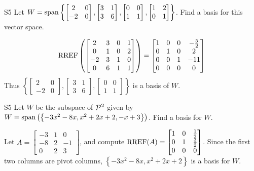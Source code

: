 \begin{problem}{S5}
Let \(
  W={\rm span}\left\{
    \begin{bmatrix} 2 & 0 \\ -2 & 0 \end{bmatrix},
    \begin{bmatrix} 3 & 1 \\ 3 & 6 \end{bmatrix},
    \begin{bmatrix} 0 & 0 \\ 1 & 1 \end{bmatrix},
    \begin{bmatrix} 1 & 2 \\ 0 & 1 \end{bmatrix}
  \right\}
\). Find a basis for this vector space.
\end{problem}
\begin{solution}
\[
  \RREF\left(\begin{bmatrix}
    2 & 3 & 0 & 1 \\
    0 & 1 & 0 & 2 \\
    -2 & 3 & 1 & 0 \\
    0 & 6 & 1 & 1
  \end{bmatrix} \right) =
  \begin{bmatrix}
    1 & 0 & 0 & -\frac{5}{2} \\
    0 & 1 & 0 & 2 \\
    0 & 0 & 1 & -11\\
    0 & 0 & 0 & 0
  \end{bmatrix}
\]
Thus \(\left\{
  \begin{bmatrix} 2 & 0 \\ -2 & 0 \end{bmatrix},
  \begin{bmatrix} 3 & 1 \\ 3 & 6 \end{bmatrix},
  \begin{bmatrix} 0 & 0 \\ 1 & 1 \end{bmatrix}
\right\}\) is a basis of $W$.
\end{solution}

\begin{problem}{S5}
Let $W$ be the subspace of $\P^2$ given by $W = {\rm span} \left( \left\{  -3x^2-8x, x^2+2x+2, -x+3\right\} \right)$.   Find a basis for $W$.
\end{problem}
\begin{solution}
Let $A= \begin{bmatrix}-3 & 1 & 0 \\ -8 & 2 & -1 \\ 0 & 2 & 3\end{bmatrix}$, and compute $\RREF(A) = \begin{bmatrix} 1 & 0 & \frac{1}{2} \\ 0 & 1 & \frac{3}{2} \\ 0 & 0 & 0 \end{bmatrix}$.
Since the first two columns are pivot columns, $\left\{ -3x^2-8x, x^2+2x+2\right\} $ is a basis for $W$.
\end{solution}

